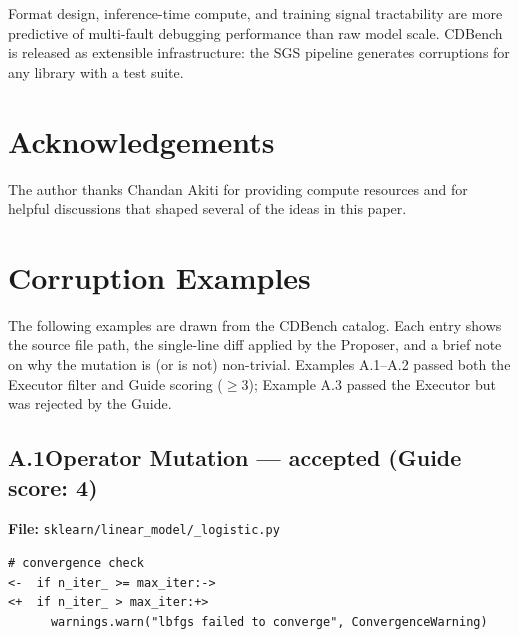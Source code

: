 \documentclass[12pt]{article}
\begin{document}
Format design, inference-time compute, and training signal tractability are more
predictive of multi-fault debugging performance than raw model scale. CDBench is
released as extensible infrastructure: the SGS pipeline generates corruptions
for any library with a test suite.



\section*{Acknowledgements}
The author thanks Chandan Akiti for providing compute resources and for
helpful discussions that shaped several of the ideas in this paper.




\appendix


\section{Corruption Examples}
\label{app:examples}

The following examples are drawn from the CDBench catalog.  Each entry shows
the source file path, the single-line diff applied by the Proposer, and a brief
note on why the mutation is (or is not) non-trivial.  Examples A.1--A.2 passed
both the Executor filter and Guide scoring ($\geq 3$); Example A.3 passed the
Executor but was rejected by the Guide.

\subsection*{A.1\quad Operator Mutation — accepted (Guide score: 4)}

\noindent\textbf{File:} \texttt{sklearn/linear\_model/\_logistic.py}

\begin{lstlisting}[style=diff]
  # convergence check
<-  if n_iter_ >= max_iter:->
<+  if n_iter_ > max_iter:+>
      warnings.warn("lbfgs failed to converge", ConvergenceWarning)
\end{lstlisting}
\end{document}
